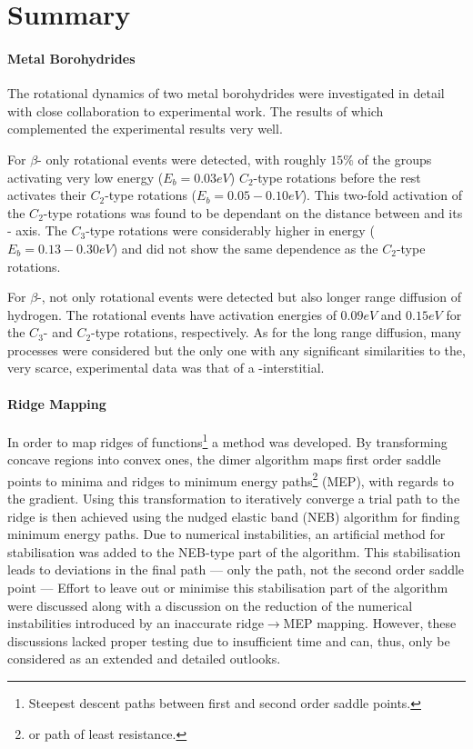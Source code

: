 \chapter{Summary}
\label{chap:summary}

\subsubsection{Metal Borohydrides}
The rotational dynamics of two metal borohydrides were investigated in detail with close collaboration to experimental work.
The results of which complemented the experimental results very well.

For $\beta$- only rotational events were detected, with roughly $15\%$ of the  groups activating very low energy ($E_b = 0.03\unit{eV}$) $C_2$-type rotations before the rest activates their $C_2$-type rotations ($E_b = 0.05 - 0.10 \unit{eV}$).
This two-fold activation of the $C_2$-type rotations was found to be dependant on the distance between  and its - axis.
The $C_3$-type rotations were considerably higher in energy ($E_b = 0.13 - 0.30 \unit{eV}$) and did not show the same dependence as the $C_2$-type rotations.

For $\beta$-, not only rotational events were detected but also longer range diffusion of hydrogen.
The rotational events have activation energies of $0.09 \unit{eV}$ and $0.15\unit{eV}$ for the $C_3$- and $C_2$-type rotations, respectively.
As for the long range diffusion, many processes were considered but the only one with any significant similarities to the, very scarce, experimental data was that of a -interstitial.

\subsubsection{Ridge Mapping}
In order to map ridges of functions\footnote{Steepest descent paths between first and second order saddle points.} a method was developed.
By transforming concave regions into convex ones, the dimer algorithm maps first order saddle points to minima and ridges to minimum energy paths\footnote{or path of least resistance.} (MEP), with regards to the gradient.
Using this transformation to iteratively converge a trial path to the ridge is then achieved using the nudged elastic band (NEB) algorithm for finding minimum energy paths.
Due to numerical instabilities, an artificial method for stabilisation was added to the NEB-type part of the algorithm.
This stabilisation leads to deviations in the final path --- only the path, not the second order saddle point ---
Effort to leave out or minimise this stabilisation part of the algorithm were discussed along with a discussion on the reduction of the numerical instabilities introduced by an inaccurate ridge$\rightarrow$MEP mapping.
However, these discussions lacked proper testing due to insufficient time and can, thus, only be considered as an extended and detailed outlooks.

